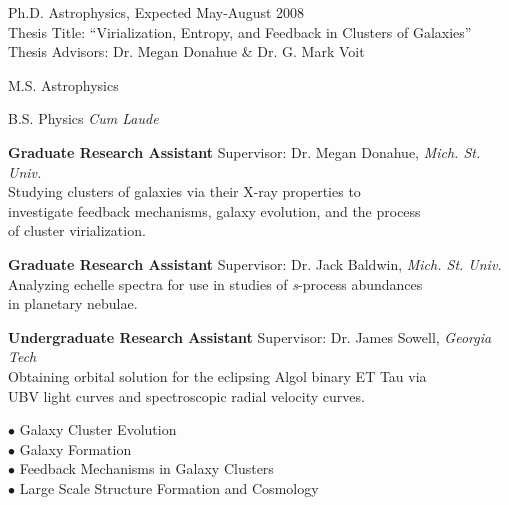 \documentclass[11pt]{cv}
\begin{document}
\begin{llist}


Ph.D. Astrophysics, Expected May-August 2008\\
Thesis Title: ``Virialization, Entropy, and Feedback in Clusters of Galaxies''\\
Thesis Advisors: Dr. Megan Donahue \& Dr. G. Mark Voit

M.S. Astrophysics

B.S. Physics {\it Cum Laude}


{\sc \bf{Graduate Research Assistant}}
Supervisor: Dr. Megan Donahue, {\textit{Mich. St. Univ.}}\\
Studying clusters of galaxies via their X-ray properties to\\
investigate feedback mechanisms, galaxy evolution, and the process\\
of cluster virialization.

{\sc \bf{Graduate Research Assistant}}
Supervisor: Dr. Jack Baldwin, {\textit{Mich. St. Univ.}}\\
Analyzing echelle spectra for use in studies of {\textit{s}}-process abundances\\
in planetary nebulae.

{\sc \bf{Undergraduate Research Assistant}}
Supervisor: Dr. James Sowell, {\textit{Georgia Tech}}\\
Obtaining orbital solution for the eclipsing Algol binary ET Tau via\\
UBV light curves and spectroscopic radial velocity curves.


{\sc $\bullet$ Galaxy Cluster Evolution}\\
{\sc $\bullet$ Galaxy Formation}\\
{\sc $\bullet$ Feedback Mechanisms in Galaxy Clusters}\\
{\sc $\bullet$ Large Scale Structure Formation and Cosmology}


\end{llist}
\end{document}
